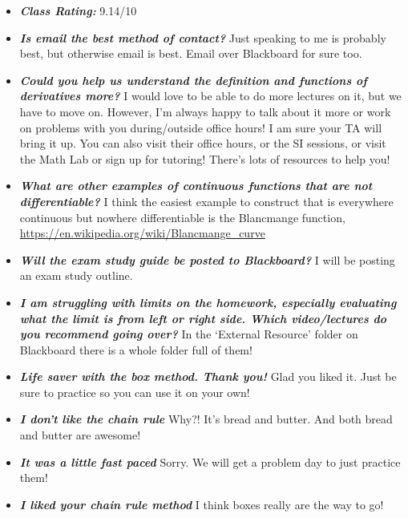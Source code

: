 \documentclass[11pt,letterpaper]{article}
\begin{document}
\begin{itemize}
\item {\bfseries\itshape Class Rating:} 9.14/10

\item {\bfseries\itshape Is email the best method of contact?} Just speaking to me is probably best, but otherwise email is best. Email over Blackboard for sure too. 

\item {\bfseries\itshape Could you help us understand the definition and functions of derivatives more?} I would love to be able to do more lectures on it, but we have to move on. However, I'm always happy to talk about it more or work on problems with you during/outside office hours! I am sure your TA will bring it up. You can also visit their office hours, or the SI sessions, or visit the Math Lab or sign up for tutoring! There's lots of resources to help you!

\item {\bfseries\itshape What are other examples of continuous functions that are not differentiable?} I think the easiest example to construct that is everywhere continuous but nowhere differentiable is the Blancmange function, \url{https://en.wikipedia.org/wiki/Blancmange\_curve}

\item {\bfseries\itshape Will the exam study guide be posted to Blackboard?} I will be posting an exam study outline.

\item {\bfseries\itshape I am struggling with limits on the homework, especially evaluating what the limit is from left or right side. Which video/lectures do you recommend going over?} In the `External Resource' folder on Blackboard there is a whole folder full of them!

\item {\bfseries\itshape Life saver with the box method. Thank you!} Glad you liked it. Just be sure to practice so you can use it on your own!

\item {\bfseries\itshape I don't like the chain rule} Why?! It's bread and butter. And both bread and butter are awesome!

\item {\bfseries\itshape It was a little fast paced} Sorry. We will get a problem day to just practice them!

\item {\bfseries\itshape I liked your chain rule method} I think boxes really are the way to go!


\end{itemize}
\end{document}
